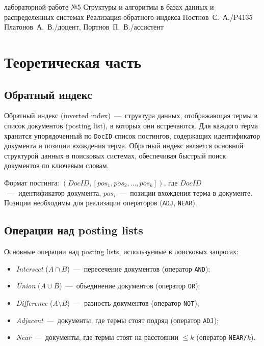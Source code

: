 \documentclass{itmo}
\begin{document}
\makereporttitle{}
	{лабораторной работе №5}
	{Структуры и алгоритмы в базах данных и распределенных системах}
	{Реализация обратного индекса}
	{}
	{Постнов~С.~А./P4135}
	{Платонов~А.~В./доцент, Портнов~П.~В./ассистент}

\maketableofcontents

\chapter{Теоретическая часть}

\section{Обратный индекс}

Обратный индекс (inverted index)~---~структура данных, отображающая термы в список документов (posting list), в которых они встречаются.
Для каждого терма хранится упорядоченный по \texttt{DocID} список постингов, содержащих идентификатор документа и позиции вхождения терма.
Обратный индекс является основной структурой данных в поисковых системах, обеспечивая быстрый поиск документов по ключевым словам.

Формат постинга: $(DocID, [pos_1, pos_2, \ldots, pos_k])$, где $DocID$~---~идентификатор документа, $pos_i$~---~позиции вхождения терма в документе.
Позиции необходимы для реализации операторов (\texttt{ADJ}, \texttt{NEAR}).

\section{Операции над posting lists}

Основные операции над posting lists, используемые в поисковых запросах:
\begin{itemize}
	\item \textit{Intersect} ($A \cap B$)~---~пересечение документов (оператор \texttt{AND});
	\item \textit{Union} ($A \cup B$)~---~объединение документов (оператор \texttt{OR});
	\item \textit{Difference} ($A \setminus B$)~---~разность документов (оператор \texttt{NOT});
	\item \textit{Adjacent}~---~документы, где термы стоят подряд (оператор \texttt{ADJ});
	\item \textit{Near}~---~документы, где термы стоят на расстоянии $\leq k$ (оператор \texttt{NEAR/$k$}).
\end{itemize}
\end{document}
